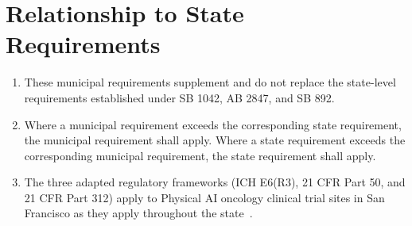 \documentclass[11pt,letterpaper]{article}
\begin{document}
\section{Relationship to State Requirements}

\begin{enumerate}[label=(\alph*)]
\item These municipal requirements supplement and do not replace the
  state-level requirements established under SB 1042, AB 2847, and SB 892.

\item Where a municipal requirement exceeds the corresponding state requirement,
  the municipal requirement shall apply. Where a state requirement exceeds the
  corresponding municipal requirement, the state requirement shall apply.

\item The three adapted regulatory frameworks (ICH E6(R3), 21 CFR Part 50, and
  21 CFR Part 312) apply to Physical AI oncology clinical trial sites in San
  Francisco as they apply throughout the state~\cite{iche6r3adapt,cfr50adapt,cfr312adapt}.
\end{enumerate}

\printbibliography[title={References}]
\end{document}
